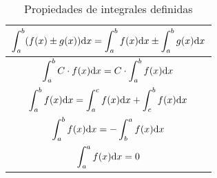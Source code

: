 \begin{table}[h]
    \centering
    \begin{tabular}{|c|}
    \hline
$\displaystyle \int_a^b (f(x)\pm g(x)) \dd x=\int_a^b f(x)\dd x \pm \int_a^b g(x) \dd x$ \\ \hline
$\displaystyle \int_a^b C \cdot f(x) \dd x=C \cdot \int_a^b f(x) \dd x$ \\ \hline
$\displaystyle \int_a^b f(x) \dd x=\int_a^c f(x) \dd x + \int_c^b f(x) \dd x$ \\ \hline
$\displaystyle \int_a^b f(x) \dd x=-\int_b^a f(x) \dd x$ \\ \hline
$\displaystyle \int_a^a f(x) \dd x=0$ \\ \hline
    \end{tabular}
    \caption{Propiedades de integrales definidas}
    \label{tab:prop-integral-def}
\end{table}
